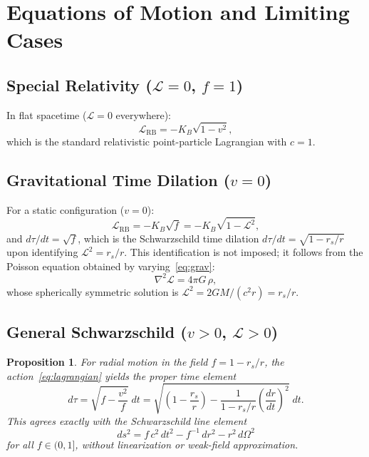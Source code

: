 \documentclass[12pt,a4paper]{article}
\newtheorem{proposition}[theorem]{Proposition}
\begin{document}
\section{Equations of Motion and Limiting Cases}

\subsection{Special Relativity ($\mathcal{L} = 0$, $f = 1$)}

In flat spacetime ($\mathcal{L} = 0$ everywhere):
\begin{equation}\label{eq:sr}
\mathcal{L}_{\mathrm{RB}} = -K_{B}\sqrt{1 - v^{2}},
\end{equation}
which is the standard relativistic point-particle Lagrangian with $c = 1$.

\subsection{Gravitational Time Dilation ($v = 0$)}

For a static configuration ($v = 0$):
\begin{equation}\label{eq:timedil}
\mathcal{L}_{\mathrm{RB}} = -K_{B}\sqrt{f} = -K_{B}\sqrt{1 - \mathcal{L}^{2}},
\end{equation}
and $d\tau/dt = \sqrt{f}$, which is the Schwarzschild time dilation $d\tau/dt = \sqrt{1 - r_{s}/r}$ upon identifying $\mathcal{L}^{2} = r_{s}/r$. This identification is not imposed; it follows from the Poisson equation obtained by varying~\eqref{eq:grav}:
\begin{equation}\label{eq:poisson}
\nabla^{2}\mathcal{L} = 4\pi G\,\rho,
\end{equation}
whose spherically symmetric solution is $\mathcal{L}^{2} = 2GM/(c^{2}r) = r_{s}/r$.

\subsection{General Schwarzschild ($v > 0$, $\mathcal{L} > 0$)}

\begin{proposition}\label{prop:schwarzschild}
For radial motion in the field $f = 1 - r_{s}/r$, the action~\eqref{eq:lagrangian} yields the proper time element
\begin{equation}\label{eq:propertime}
d\tau = \sqrt{f - \frac{v^{2}}{f}}\;dt = \sqrt{\left(1 - \frac{r_{s}}{r}\right) - \frac{1}{1 - r_{s}/r}\left(\frac{dr}{dt}\right)^{2}}\;dt.
\end{equation}
This agrees exactly with the Schwarzschild line element
\[
ds^{2} = f\,c^{2}\,dt^{2} - f^{-1}\,dr^{2} - r^{2}\,d\Omega^{2}
\]
for all $f \in (0, 1]$, without linearization or weak-field approximation.
\end{proposition}
\end{document}
